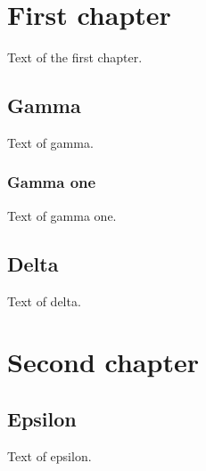 \documentclass{book}
\begin{document}
\tableofcontents
\chapter{First chapter}
\startcontents
{}
Text of the first chapter.
\section{Gamma}
Text of gamma.
\subsection{Gamma one}
Text of gamma one.
\section{Delta}
Text of delta.
\chapter{Second chapter}
\section{Epsilon}
Text of epsilon.
\end{document}
